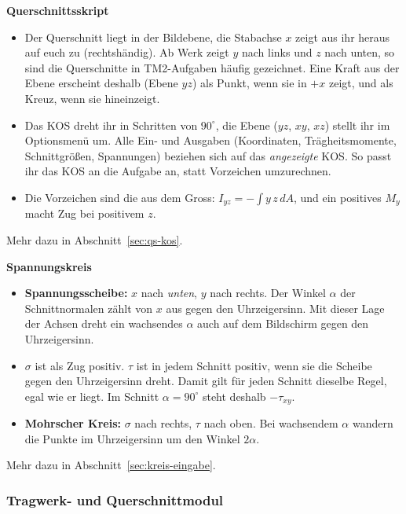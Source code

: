 \textbf{Querschnittsskript}
\begin{itemize}
  \item Der Querschnitt liegt in der Bildebene, die Stabachse $x$ zeigt aus ihr heraus auf euch zu
        (rechtshändig). Ab Werk zeigt $y$ nach links und $z$ nach unten, so sind die Querschnitte in
        TM2-Aufgaben häufig gezeichnet. Eine Kraft aus der Ebene erscheint deshalb (Ebene $yz$) als
        Punkt, wenn sie in $+x$ zeigt, und als Kreuz, wenn sie hineinzeigt.
  \item Das KOS dreht ihr in Schritten von $90^\circ$, die Ebene ($yz$, $xy$, $xz$) stellt ihr im
        Optionsmenü um. Alle Ein- und Ausgaben (Koordinaten, Trägheitsmomente, Schnittgrößen,
        Spannungen) beziehen sich auf das \emph{angezeigte} KOS. So passt ihr das KOS an die
        Aufgabe an, statt Vorzeichen umzurechnen.
  \item Die Vorzeichen sind die aus dem Gross: $I_{yz} = -\int y\,z\,dA$, und ein positives $M_y$
        macht Zug bei positivem $z$.
\end{itemize}
Mehr dazu in Abschnitt~\ref{sec:qs-kos}.

\textbf{Spannungskreis}
\begin{itemize}
  \item \textbf{Spannungsscheibe:} $x$ nach \emph{unten}, $y$ nach rechts. Der Winkel $\alpha$ der
        Schnittnormalen zählt von $x$ aus gegen den Uhrzeigersinn. Mit dieser Lage der Achsen dreht
        ein wachsendes $\alpha$ auch auf dem Bildschirm gegen den Uhrzeigersinn.
  \item $\sigma$ ist als Zug positiv. $\tau$ ist in jedem Schnitt positiv, wenn sie die Scheibe gegen
        den Uhrzeigersinn dreht. Damit gilt für jeden Schnitt dieselbe Regel, egal wie er liegt. Im
        Schnitt $\alpha = 90^\circ$ steht deshalb $-\tau_{xy}$.
  \item \textbf{Mohrscher Kreis:} $\sigma$ nach rechts, $\tau$ nach oben. Bei wachsendem $\alpha$
        wandern die Punkte im Uhrzeigersinn um den Winkel $2\alpha$.
\end{itemize}
Mehr dazu in Abschnitt~\ref{sec:kreis-eingabe}.

\subsubsection{Tragwerk- und Querschnittmodul}


